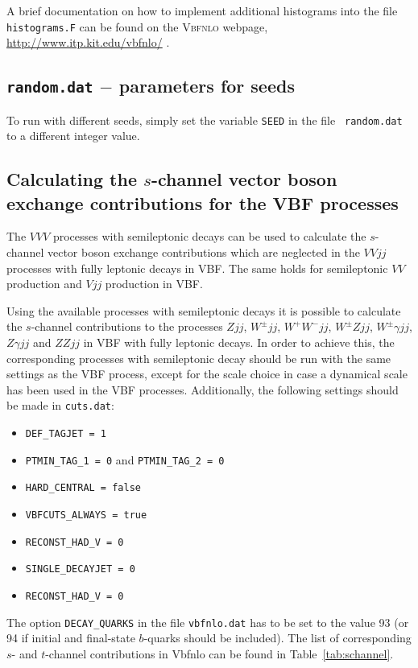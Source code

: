 \documentclass[english,12pt]{article}
\newcommand{\VBFNLO}{\textsc{Vbfnlo}}
\begin{document}
A brief documentation on how to implement additional histograms into the file {\tt histograms.F}
can be found on the \VBFNLO{} webpage,
\href{http://www.itp.kit.edu/vbfnlo/}{http://www.itp.kit.edu/vbfnlo/} .




\subsection{{\tt random.dat} $-$ parameters for seeds}
\label{sec:random}
To run with different seeds, simply set the variable {\tt SEED} in the file {\tt
random.dat} to a different integer value.






\subsection[Calculating the $s$-channel contributions for the VBF processes]{Calculating the $s$-channel vector boson exchange contributions for the VBF processes}
\label{sec:schan}
The $VVV$ processes with semileptonic decays can be used to calculate
the $s$-channel vector boson exchange contributions which are neglected in the $VVjj$ processes
with fully leptonic decays in VBF. The same holds for semileptonic $VV$ production and $Vjj$
production in VBF.

Using the available processes with semileptonic decays it is possible to calculate the $s$-channel
contributions to the processes $Zjj$, $W^\pm jj$, $W^+W^-jj$, $W^\pm
Zjj$, $W^\pm\gamma jj$, $Z\gamma jj$
and $ZZjj$ in VBF with fully leptonic decays.
In order to achieve this, the corresponding processes with semileptonic decay should be
run with the same settings as the VBF process, except for the scale choice in case a 
dynamical scale has been used in the VBF processes.
Additionally, the following settings should be made in {\tt cuts.dat}:
\begin{itemize}
 \item {\tt DEF\_TAGJET = 1}
 \item {\tt PTMIN\_TAG\_1 = 0} and {\tt PTMIN\_TAG\_2 = 0}
 \item {\tt HARD\_CENTRAL = false}
 \item {\tt VBFCUTS\_ALWAYS = true}
 \item {\tt RECONST\_HAD\_V = 0}
 \item {\tt SINGLE\_DECAYJET = 0}
 \item {\tt RECONST\_HAD\_V = 0}
\end{itemize}
The option {\tt DECAY\_QUARKS} in the file {\tt vbfnlo.dat} has to be set to the value 93 (or 94
if initial and final-state $b$-quarks should be included).
The list of corresponding $s$- and $t$-channel contributions in {\sc Vbfnlo} can be found in Table~\ref{tab:schannel}.
\end{document}
